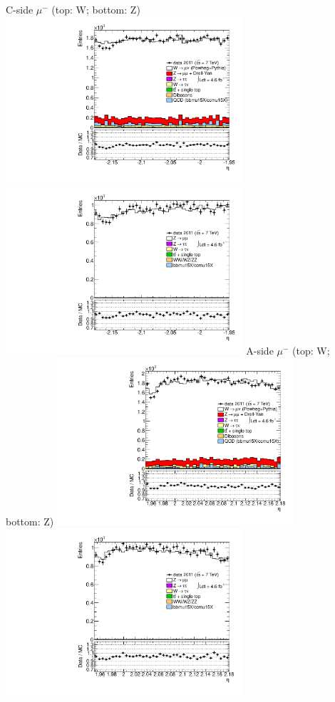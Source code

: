  {
\colb[T]
C-side $\mu^{-}$ (top: W; bottom: Z)
\centering
\includegraphics[width=0.66\textwidth]{dates/20130306/figures/etaphi/WpDtoH_10_C_stack_l_eta_NEG} \\
\includegraphics[width=0.66\textwidth]{dates/20130306/figures/etaphi/Z_10_C_stack_lN_eta_ALL.pdf}
A-side $\mu^{-}$ (top: W; bottom: Z)
\centering
\includegraphics[width=0.66\textwidth]{dates/20130306/figures/etaphi/WpDtoH_10_A_stack_l_eta_NEG} \\
\includegraphics[width=0.66\textwidth]{dates/20130306/figures/etaphi/Z_10_A_stack_lN_eta_ALL.pdf} 
\cole
}
